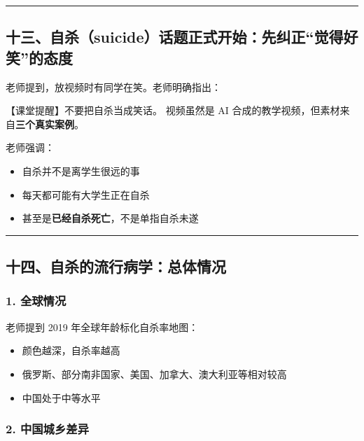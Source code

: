 \documentclass[
  chinese,
  9pt,
  a4paper,
]{ctexart}
\providecommand{\tightlist}{%
  \setlength{\itemsep}{0pt}\setlength{\parskip}{0pt}}
\begin{document}
\begin{center}\rule{0.5\linewidth}{0.5pt}\end{center}

\subsection{十三、自杀（suicide）话题正式开始：先纠正``觉得好笑''的态度}\label{ux5341ux4e09ux81eaux6740suicideux8bddux9898ux6b63ux5f0fux5f00ux59cbux5148ux7ea0ux6b63ux89c9ux5f97ux597dux7b11ux7684ux6001ux5ea6}

老师提到，放视频时有同学在笑。老师明确指出：

【课堂提醒】不要把自杀当成笑话。 视频虽然是 AI
合成的教学视频，但素材来自\textbf{三个真实案例}。

老师强调：

\begin{itemize}
\tightlist
\item
  自杀并不是离学生很远的事
\item
  每天都可能有大学生正在自杀
\item
  甚至是\textbf{已经自杀死亡}，不是单指自杀未遂
\end{itemize}

\begin{center}\rule{0.5\linewidth}{0.5pt}\end{center}

\subsection{十四、自杀的流行病学：总体情况}\label{ux5341ux56dbux81eaux6740ux7684ux6d41ux884cux75c5ux5b66ux603bux4f53ux60c5ux51b5}

\subsubsection{1. 全球情况}\label{ux5168ux7403ux60c5ux51b5}

老师提到 2019 年全球年龄标化自杀率地图：

\begin{itemize}
\tightlist
\item
  颜色越深，自杀率越高
\item
  俄罗斯、部分南非国家、美国、加拿大、澳大利亚等相对较高
\item
  中国处于中等水平
\end{itemize}

\subsubsection{2.
中国城乡差异}\label{ux4e2dux56fdux57ceux4e61ux5deeux5f02}
\end{document}
